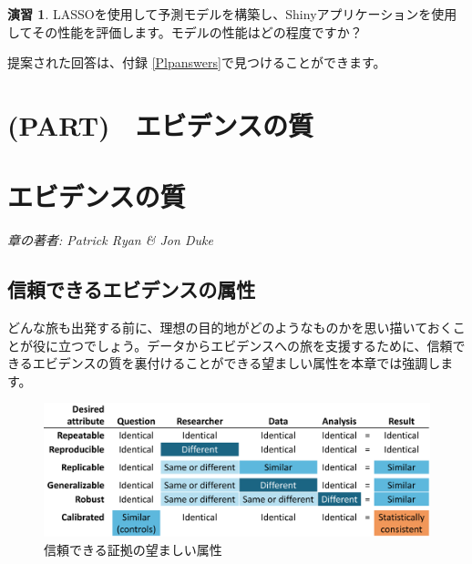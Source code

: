 \documentclass[
  11pt]{book}
\theoremstyle{definition}
\theoremstyle{definition}
\theoremstyle{definition}
\newtheorem{exercise}{演習}[chapter]
\theoremstyle{definition}
\theoremstyle{remark}
\begin{document}
\begin{exercise}
\protect\hypertarget{exr:exercisePlp3}{}\label{exr:exercisePlp3}LASSOを使用して予測モデルを構築し、Shinyアプリケーションを使用してその性能を評価します。モデルの性能はどの程度ですか？
\end{exercise}

提案された回答は、付録 \ref{Plpanswers}で見つけることができます。

\chapter*{(PART)　エビデンスの質}\label{part-ux30a8ux30d3ux30c7ux30f3ux30b9ux306eux8cea}

\chapter{エビデンスの質}\label{EvidenceQuality}

\emph{章の著者: Patrick Ryan \& Jon Duke}


\section{信頼できるエビデンスの属性}\label{ux4fe1ux983cux3067ux304dux308bux30a8ux30d3ux30c7ux30f3ux30b9ux306eux5c5eux6027}

どんな旅も出発する前に、理想の目的地がどのようなものかを思い描いておくことが役に立つでしょう。データからエビデンスへの旅を支援するために、信頼できるエビデンスの質を裏付けることができる望ましい属性を本章では強調します。

\begin{figure}

{\centering \includegraphics[width=1\linewidth]{images/EvidenceQuality/reliableevidenceattributes} 

}

\caption{信頼できる証拠の望ましい属性}\label{fig:attributesOfEvidence}
\end{figure}
\end{document}
